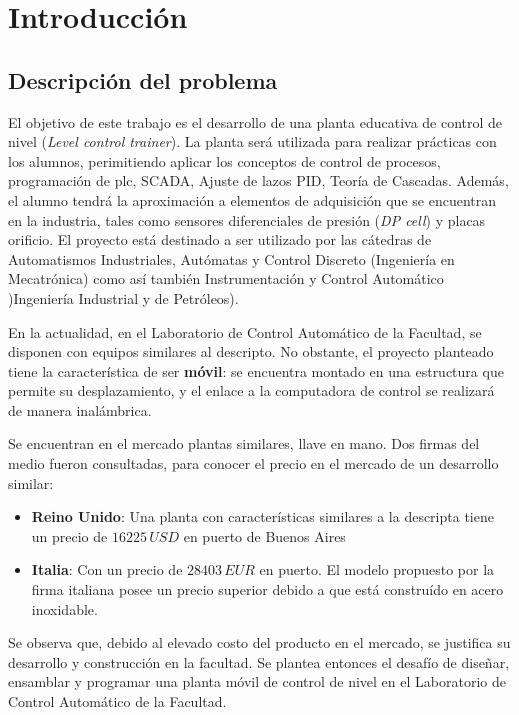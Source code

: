 \chapter{Introducción}
\label{ch:intro}

\section{Descripción del problema}
\label{sec:DescripcionProblema}
El objetivo de este trabajo es el desarrollo de una planta 
educativa de control de nivel
(\textit{Level control trainer}).
La planta será utilizada para realizar prácticas con los
alumnos, perimitiendo aplicar los conceptos de 
control de procesos, programación de \gls{plc}, SCADA,
Ajuste de lazos PID, Teoría de Cascadas. 
Además, el alumno tendrá la aproximación a elementos de adquisición que 
se encuentran en la industria, tales como sensores diferenciales de presión
(\textit{DP cell}) y placas orificio.
El proyecto está destinado a ser utilizado por las cátedras de
Automatismos Industriales, Autómatas y Control Discreto 
(Ingeniería en Mecatrónica)
como así también Instrumentación y Control Automático )Ingeniería Industrial
y de Petróleos).

En la actualidad, en el Laboratorio de Control Automático de la Facultad, 
se disponen con equipos similares al descripto.
No obstante, el proyecto planteado tiene la característica de ser 
\textbf{móvil}: se encuentra montado en una estructura que 
permite su desplazamiento, y el enlace a la 
computadora de control se realizará de manera inalámbrica.

Se encuentran en el mercado plantas similares, llave en mano. 
Dos firmas del medio fueron consultadas, para conocer 
el precio en el mercado de un desarrollo similar:
\begin{itemize}
 \item \textbf{Reino Unido}: Una planta con características similares
 a la descripta tiene un precio de $16225\,USD$ en puerto de Buenos Aires
 \item \textbf{Italia}: Con un precio de $28403\,EUR$ en puerto. 
 El modelo propuesto por la firma italiana
 posee un precio superior debido a que está construído en acero inoxidable.
\end{itemize}

Se observa que, debido al elevado costo del producto en el mercado,
se justifica su desarrollo  y construcción
en la facultad.
Se plantea entonces el desafío de diseñar, ensamblar y programar una planta
móvil de control de nivel en 
el Laboratorio de Control Automático de la Facultad.

